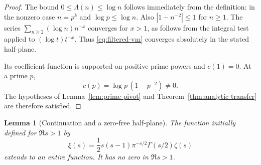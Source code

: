 \documentclass[11pt]{article}
\numberwithin{equation}{section}
\newtheorem{lemma}[theorem]{Lemma}
\theoremstyle{definition}
\theoremstyle{remark}
\begin{document}
\begin{proof}
The bound $0\leq\Lambda(n)\leq\log n$ follows immediately from the definition: in the nonzero
case $n=p^k$ and $\log p\leq\log n$.  Also $|1-n^{-2}|\leq1$ for $n\geq1$.  The series
$\sum_{n\geq2}(\log n)n^{-x}$ converges for $x>1$, as follows from the integral test applied to
$(\log t)t^{-x}$.  Thus \eqref{eq:filtered-vm} converges absolutely in the stated half-plane.

Its coefficient function is supported on positive prime powers and $c(1)=0$.  At a prime $p$,
\[
 c(p)=\log p\,(1-p^{-2})\neq0.
\]
The hypotheses of Lemma~\ref{lem:prime-pivot} and
Theorem~\ref{thm:analytic-transfer} are therefore satisfied.
\end{proof}

\begin{lemma}[Continuation and a zero-free half-plane]
\label{lem:xi-analytic}
The function initially defined for $\Re s>1$ by
\begin{equation}
 \xi(s)=\frac12s(s-1)\pi^{-s/2}\Gamma(s/2)\zeta(s)
 \label{eq:xi-def}
\end{equation}
extends to an entire function.  It has no zero in $\Re s>1$.
\end{lemma}
\end{document}
